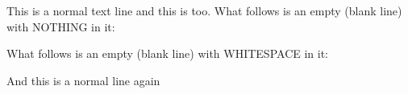 This is a normal text line
   and this is too.
What follows is an empty (blank line) with NOTHING in it:

What follows is an empty (blank line) with WHITESPACE in it:
    	   	
And this is a normal line again